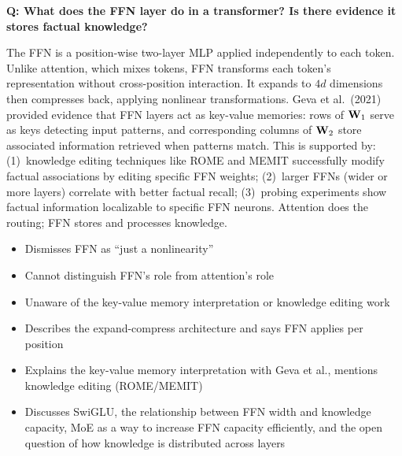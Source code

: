 \bigskip

\begin{interviewq}
\textbf{Q: What does the FFN layer do in a transformer? Is there evidence it
stores factual knowledge?}

 \quad {} \quad \badgefreq{\freqmed}

\stronganswer
The FFN is a position-wise two-layer MLP applied independently to each token.
Unlike attention, which mixes tokens, FFN transforms each token's
representation without cross-position interaction.  It expands to $4d$ dimensions
then compresses back, applying nonlinear transformations.  Geva et al.\ (2021)
provided evidence that FFN layers act as key-value memories: rows of $\mathbf{W}_1$
serve as keys detecting input patterns, and corresponding columns of $\mathbf{W}_2$
store associated information retrieved when patterns match.  This is supported
by: (1)~knowledge editing techniques like ROME and MEMIT successfully modify
factual associations by editing specific FFN weights; (2)~larger FFNs
(wider or more layers) correlate with better factual recall; (3)~probing
experiments show factual information localizable to specific FFN neurons.
Attention does the routing; FFN stores and processes knowledge.

\redflags
\begin{itemize}
    \item Dismisses FFN as ``just a nonlinearity''
    \item Cannot distinguish FFN's role from attention's role
    \item Unaware of the key-value memory interpretation or knowledge editing work
\end{itemize}


\goodgreat
\begin{itemize}
    \item {} Describes the expand-compress architecture and says FFN
          applies per position
    \item {} Explains the key-value memory interpretation with Geva
          et al., mentions knowledge editing (ROME/MEMIT)
    \item {} Discusses SwiGLU, the relationship between FFN width
          and knowledge capacity, MoE as a way to increase FFN capacity efficiently,
          and the open question of how knowledge is distributed across layers
\end{itemize}

\end{interviewq}

